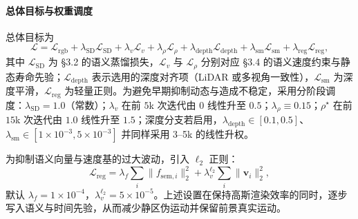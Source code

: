 \documentclass[10pt,conference]{IEEEtran} %
\begin{document}
\paragraph{总体目标与权重调度}
总体目标为
\begin{equation}
\mathcal L=\mathcal L_{\mathrm{rgb}}+\lambda_{\mathrm{SD}}\mathcal L_{\mathrm{SD}}
+\lambda_v \mathcal L_v+\lambda_\rho \mathcal L_\rho
+\lambda_{\mathrm{depth}}\mathcal L_{\mathrm{depth}}
+\lambda_{\mathrm{sm}}\mathcal L_{\mathrm{sm}}
+\lambda_{\mathrm{reg}}\mathcal L_{\mathrm{reg}},
\label{eq:opt_total}
\end{equation}
其中 $\mathcal L_{\mathrm{SD}}$ 为 §3.2 的语义蒸馏损失，$\mathcal L_v$ 与 $\mathcal L_\rho$ 分别对应 §3.4 的语义速度约束与静态寿命先验；$\mathcal L_{\mathrm{depth}}$ 表示选用的深度对齐项（LiDAR 或多视角一致性），$\mathcal L_{\mathrm{sm}}$ 为深度平滑，$\mathcal L_{\mathrm{reg}}$ 为轻量正则。为避免早期抑制动态与造成不稳定，采用分阶段调度：$\lambda_{\mathrm{SD}}{=}1.0$（常数）；$\lambda_v$ 在前 $5$k 次迭代由 $0$ 线性升至 $0.5$；$\lambda_\rho\equiv 0.15$；$\rho^\star$ 在前 $15$k 次迭代由 $1.0$ 线性升至 $1.5$；深度分支若启用，$\lambda_{\mathrm{depth}}\in[0.1,0.5]$、$\lambda_{\mathrm{sm}}\in[1\!\times\!10^{-3},5\!\times\!10^{-3}]$ 并同样采用 3--5k 的线性升权。

为抑制语义向量与速度基的过大波动，引入 $\ell_2$ 正则：
\begin{equation}
\mathcal L_{\mathrm{reg}}=\lambda_f\sum_i \|f_{\mathrm{sem},i}\|_2^2+\lambda_v^{\ell_2}\sum_i \|\bm v_i\|_2^2,
\end{equation}
默认 $\lambda_f{=}1\!\times\!10^{-4}$，$\lambda_v^{\ell_2}{=}5\!\times\!10^{-5}$。上述设置在保持高斯渲染效率的同时，逐步写入语义与时间先验，从而减少静区伪运动并保留前景真实运动。
\end{document}
